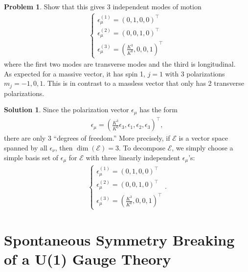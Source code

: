\documentclass{book}
\numberwithin{equation}{section}
\theoremstyle{definition}
\newtheorem{prob}{Problem}[section]
\newtheorem{sln}{Solution}[section]
\begin{document}
\begin{prob}
	Show that this gives 3 independent modes of motion
	\begin{align}
	\begin{cases}
	\epsilon^{(1)}_\mu = (0,1,0,0)^\top\\
	\epsilon^{(2)}_\mu = (0,0,1,0)^\top\\
	\epsilon^{(3)}_\mu = \left(\frac{K^3}{K^0},0,0,1\right)^\top
	\end{cases}
	\end{align}
	where the first two modes are transverse modes and the third is longitudinal.\\
	
	As expected for a massive vector, it has spin 1, $j=1$ with 3 polarizations $m_j = -1,0,1$. This is in contrast to a massless vector that only has 2 transverse polarizations. \\
	
	\begin{sln}
		Since the polarization vector $\epsilon_\mu$ has the form
		\begin{align}
		\epsilon_\mu = \left(\frac{K^3}{K^0}\epsilon_3,\epsilon_1,\epsilon_2,\epsilon_3 \right)^\top,
		\end{align}
		there are only 3 ``degrees of freedom.'' More precisely, if $\mathcal{E}$ is a vector space spanned by all $\epsilon_\nu$, then $\dim(\mathcal{E}) = 3$. To decompose $\mathcal{E}$, we simply choose a simple basis set of $\epsilon_\mu$ for $\mathcal{E}$ with three linearly independent $\epsilon_\mu$'s:
		\begin{align}
		\begin{cases}
		\epsilon^{(1)}_\mu = (0,1,0,0)^\top\\
		\epsilon^{(2)}_\mu = (0,0,1,0)^\top\\
		\epsilon^{(3)}_\mu = \left(\frac{K^3}{K^0},0,0,1\right)^\top
		\end{cases}.
		\end{align}
	\end{sln}
\end{prob}













\newpage






\section{Spontaneous Symmetry Breaking of a U(1) Gauge Theory}
\end{document}
